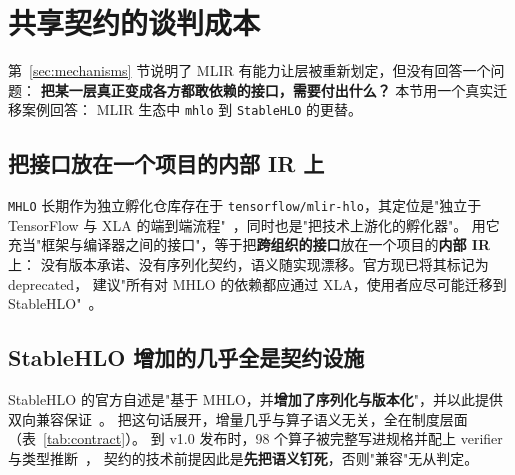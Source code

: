
\section{共享契约的谈判成本}
\label{sec:contract}

第~\ref{sec:mechanisms} 节说明了 MLIR 有能力让层被重新划定，但没有回答一个问题：
\textbf{把某一层真正变成各方都敢依赖的接口，需要付出什么？} 本节用一个真实迁移案例回答：
MLIR 生态中 \texttt{mhlo} 到 \texttt{StableHLO} 的更替。

\subsection{把接口放在一个项目的内部 IR 上}

\texttt{MHLO} 长期作为独立孵化仓库存在于 \texttt{tensorflow/mlir-hlo}，其定位是"独立于
TensorFlow 与 XLA 的端到端流程"~\cite{mlirhlorepo}，同时也是"把技术上游化的孵化器"。
用它充当"框架与编译器之间的接口"，等于把\textbf{跨组织的接口}放在一个项目的\textbf{内部 IR} 上：
没有版本承诺、没有序列化契约，语义随实现漂移。官方现已将其标记为 deprecated，
建议"所有对 MHLO 的依赖都应通过 XLA，使用者应尽可能迁移到 StableHLO"~\cite{mlirhlorepo}。

\subsection{StableHLO 增加的几乎全是契约设施}

StableHLO 的官方自述是"基于 MHLO，并\textbf{增加了序列化与版本化}"，并以此提供双向兼容保证~\cite{stablehlorepo,stablehlospec}。
把这句话展开，增量几乎与算子语义无关，全在制度层面（表~\ref{tab:contract}）。
到 v1.0 发布时，98 个算子被完整写进规格并配上 verifier 与类型推断~\cite{stablehlov1}，
契约的技术前提因此是\textbf{先把语义钉死}，否则"兼容"无从判定。

